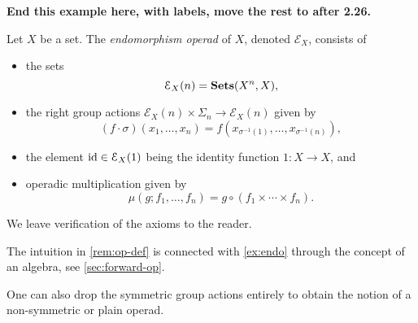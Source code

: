 \begin{example}
 \textbf{End this example here, with labels, move the rest to after 2.26.}



  
\end{example}

\begin{example}\label{ex:endo}
Let $X$ be a set. The \emph{endomorphism operad} of $X$, denoted $\mathcal{E}_X$, consists of 
\begin{itemize}
\item the sets
\[
\mathcal{E}_X(n) = \mathbf{Sets}(X^n, X),
\]
\item the right group actions $\mathcal{E}_X(n) \times \Sigma_n \to \mathcal{E}_X(n)$ given by
\[
(f \cdot \sigma)(x_1, \ldots, x_n) = f( x_{\sigma^{-1}(1)}, \ldots, x_{\sigma^{-1}(n)}),
\]
\item the element $\textrm{id} \in \mathcal{E}_X(1)$ being the identity function $1 \colon X \to X$, and
\item operadic multiplication given by
\[
\mu(g; f_1, \ldots, f_n) = g \circ (f_1 \times \cdots \times f_n).
\]
\end{itemize}
We leave verification of the axioms to the reader.
\end{example}

\begin{rem}
The intuition in \cref{rem:op-def} is connected with \cref{ex:endo} through the concept of an algebra, see \cref{sec:forward-op}.
\end{rem}

One can also drop the symmetric group actions entirely to obtain the notion of a non-symmetric or plain operad.

